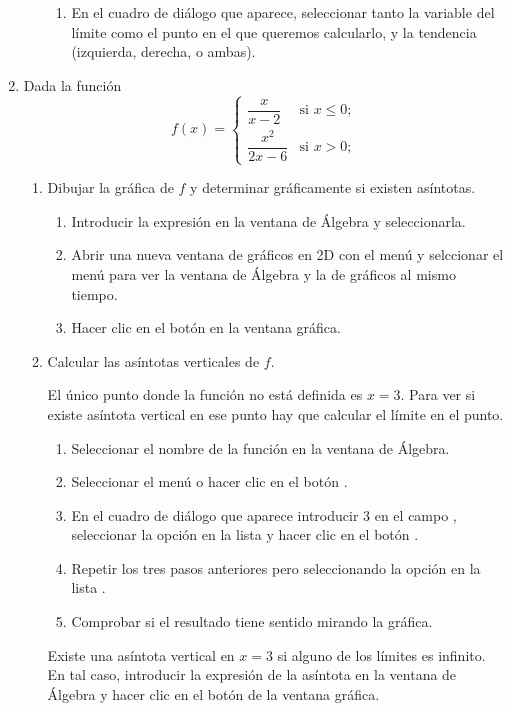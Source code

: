 \begin{enumerate}[leftmargin=*]
\begin{enumerate}
\begin{indicacion}
\begin{enumerate}
\item En el cuadro de diálogo que aparece, seleccionar tanto la variable del límite como el punto en el que queremos calcularlo, y la
tendencia (izquierda, derecha, o ambas).
\end{enumerate}
\end{indicacion}
\end{enumerate}


\item Dada la función 
\[
f(x)=
\begin{cases}
\dfrac{x}{x-2} & \mbox{si $x\leq 0$;}\\
\dfrac{x^2}{2x-6} & \mbox{si $x>0$;}
\end{cases}
\]
\begin{enumerate}
\item Dibujar la gráfica de $f$ y determinar gráficamente si existen asíntotas.
\begin{indicacion}
\begin{enumerate}
\item Introducir la expresión  en la ventana de Álgebra y seleccionarla.
\item Abrir una nueva ventana de gráficos en 2D con el menú  y selccionar el menú  para ver la ventana de Álgebra y la de gráficos al mismo tiempo.  
\item Hacer clic en el botón  en la ventana gráfica.
\end{enumerate}
\end{indicacion}

\item Calcular las asíntotas verticales de $f$.
\begin{indicacion}
El único punto donde la función no está definida es $x=3$.
Para ver si existe asíntota vertical en ese punto hay que calcular el límite en el punto.
\begin{enumerate}
\item Seleccionar el nombre de la función en la ventana de Álgebra.
\item Seleccionar el menú  o hacer clic en el botón .
\item En el cuadro de diálogo que aparece introducir 3 en el campo , seleccionar la opción  en la lista  y hacer clic en el botón . 
\item Repetir los tres pasos anteriores pero seleccionando la opción  en la lista .
\item Comprobar si el resultado tiene sentido mirando la gráfica.
\end{enumerate}
Existe una asíntota vertical en $x=3$ si alguno de los límites es infinito.
En tal caso, introducir la expresión de la asíntota en la ventana de Álgebra y hacer clic en el botón  de la ventana gráfica.
\end{indicacion}


\end{enumerate}
\end{enumerate}
